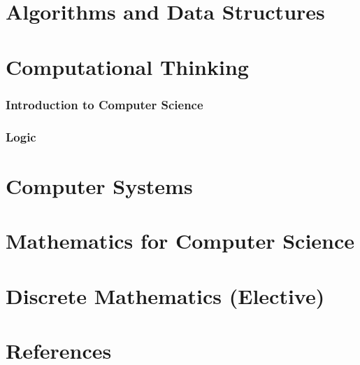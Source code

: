 \documentclass{article}
\title{\thetitle\\[0.5em]\large{\thesubtitle}}
\author{\theauthor}
\date{\thedate}
\begin{document}
\maketitle\thispagestyle{empty} %
\setcounter{tocdepth}{2}
\newpage\tableofcontents %

\clearpage\setcounter{page}{1}\newpage %
\pagestyle{fancy}





\part{Algorithms and Data Structures}


\newpage\part{Computational Thinking}

\section{Introduction to Computer Science}

\section{Logic}

\newpage\part{Computer Systems}


\newpage\part{Mathematics for Computer Science}


\newpage\part{Discrete Mathematics (Elective)}


\newpage\part{References}
\end{document}
